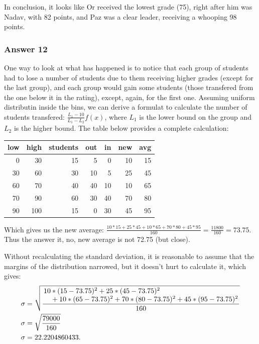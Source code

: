 \documentclass[11pt]{article}
\begin{document}
In conclusion, it looks like Or received the lowest grade (75), right
after him was Nadav, with 82 points, and Paz was a clear leader,
receiving a whooping 98 points.
\subsubsection{Answer 12}
\label{sec-1-3-4}
One way to look at what has happened is to notice that each group of
students had to lose a number of students due to them receiving higher
grades (except for the last group), and each group would gain some
students (those transfered from the one below it in the rating),
except, again, for the first one.  Assuming uniform distributin inside
the bins, we can derive a formulat to calculate the number of students
transfered: $\frac{L_1 - 10}{L_1 - L_2}f(x)$, where $L_1$ is the lower
bound on the group and $L_2$ is the higher bound.  The table below
provides a complete calculation:

\begin{center}
\begin{tabular}{rrrrrrr}
low & high & students & out & in & new & avg\\
\hline
0 & 30 & 15 & 5 & 0 & 10 & 15\\
30 & 60 & 30 & 10 & 5 & 25 & 45\\
60 & 70 & 40 & 40 & 10 & 10 & 65\\
70 & 90 & 60 & 30 & 40 & 70 & 80\\
90 & 100 & 15 & 0 & 30 & 45 & 95\\
\end{tabular}
\end{center}

Which gives us the new average:
$\frac{10*15+25*45+10*65+70*80+45*95}{160}=\frac{11800}{160}=73.75$.
Thus the answer it, no, new average is not 72.75 (but close).

Without recalculating the standard deviation, it is reasonable to
assume that the margins of the distribution narrowed, but it doesn't
hurt to calculate it, which gives:
\begin{equation*}
  \begin{aligned}
    \sigma &= \sqrt{\frac{\splitfrac{10 * (15 - 73.75)^2 + 25 * (45 - 73.75)^2}
          {+ 10 * (65 - 73.75)^2 + 70 * (80 - 73.75)^2 + 45 * (95 - 73.75)^2}}{160}} \\
    \sigma &= \sqrt{\frac{79000}{160}} \\
    \sigma &= 22.2204860433.
  \end{aligned}
\end{equation*}
\end{document}
